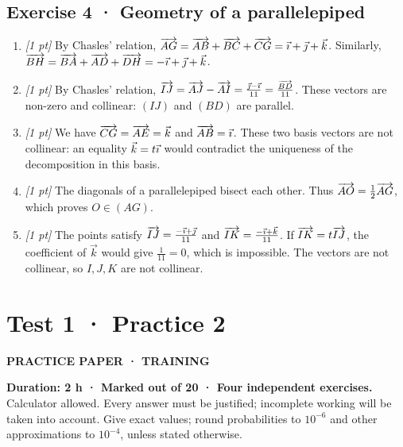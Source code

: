 \subsection*{Exercise 4 · Geometry of a parallelepiped}\begin{enumerate}

\item \textit{[1 pt]} By Chasles' relation, $\overrightarrow{AG}=\overrightarrow{AB}+\overrightarrow{BC}+\overrightarrow{CG}=\vec{\imath} +\vec{\jmath} +\vec k$. Similarly, $\overrightarrow{BH}=\overrightarrow{BA}+\overrightarrow{AD}+\overrightarrow{DH}=-\vec{\imath} +\vec{\jmath} +\vec k$.

\item \textit{[1 pt]} By Chasles' relation, $\overrightarrow{IJ}=\overrightarrow{AJ}-\overrightarrow{AI}=\frac{\vec{\jmath} -\vec{\imath} }{11}=\frac{\overrightarrow{BD}}{11}$. These vectors are non-zero and collinear: $(IJ)$ and $(BD)$ are parallel.

\item \textit{[1 pt]} We have $\overrightarrow{CG}=\overrightarrow{AE}=\vec k$ and $\overrightarrow{AB}=\vec{\imath} $. These two basis vectors are not collinear: an equality $\vec k=t\vec{\imath} $ would contradict the uniqueness of the decomposition in this basis.

\item \textit{[1 pt]} The diagonals of a parallelepiped bisect each other. Thus $\overrightarrow{AO}=\frac12\overrightarrow{AG}$, which proves $O\in(AG)$.

\item \textit{[1 pt]} The points satisfy $\overrightarrow{IJ}=\frac{-\vec{\imath} +\vec{\jmath} }{11}$ and $\overrightarrow{IK}=\frac{-\vec{\imath} +\vec k}{11}$. If $\overrightarrow{IK}=t\overrightarrow{IJ}$, the coefficient of $\vec k$ would give $\frac{1}{11}=0$, which is impossible. The vectors are not collinear, so $I,J,K$ are not collinear.

\end{enumerate}

\fi

\clearpage{}\label{sujet:1-2}

\section*{Test 1 · Practice 2}

{\sffamily\bfseries\color{teal}PRACTICE PAPER · TRAINING\par}

\textbf{Duration: 2 h · Marked out of 20 · Four independent exercises.}\\Calculator allowed. Every answer must be justified; incomplete working will be taken into account. Give exact values; round probabilities to $10^{-6}$ and other approximations to $10^{-4}$, unless stated otherwise.

